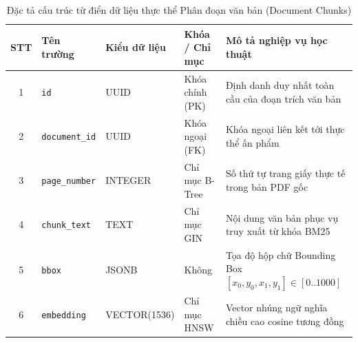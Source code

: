 \begin{table}[htbp]
\centering
\singlespacing
\small
\renewcommand{\arraystretch}{1.2}
\caption{Đặc tả cấu trúc từ điển dữ liệu thực thể Phân đoạn văn bản (Document Chunks)}
\label{tab:document_chunks}
\setlength{\tabcolsep}{3.5pt}
\begin{tabular}{|c|>{\raggedright\arraybackslash}p{3.4cm}|>{\raggedright\arraybackslash}p{2.8cm}|>{\raggedright\arraybackslash}p{2.2cm}|>{\raggedright\arraybackslash}p{4.4cm}|}
\hline
\textbf{STT} & \centering\textbf{Tên trường} & \centering\textbf{Kiểu dữ liệu} & \centering\textbf{Khóa / Chỉ mục} & \centering\textbf{Mô tả nghiệp vụ học thuật} \tabularnewline \hline
1 & \texttt{id} & UUID & Khóa chính (PK) & Định danh duy nhất toàn cầu của đoạn trích văn bản \\ \hline
2 & \texttt{document\_id} & UUID & Khóa ngoại (FK) & Khóa ngoại liên kết tới thực thể ấn phẩm \\ \hline
3 & \texttt{page\_number} & INTEGER & Chỉ mục B-Tree & Số thứ tự trang giấy thực tế trong bản PDF gốc \\ \hline
4 & \texttt{chunk\_text} & TEXT & Chỉ mục GIN & Nội dung văn bản phục vụ truy xuất từ khóa BM25 \\ \hline
5 & \texttt{bbox} & JSONB & Không & Tọa độ hộp chữ Bounding Box $[x_0, y_0, x_1, y_1] \in [0..1000]$ \\ \hline
6 & \texttt{embedding} & VECTOR(1536) & Chỉ mục HNSW & Vector nhúng ngữ nghĩa chiều cao cosine tương đồng \\ \hline
\end{tabular}
\end{table}

